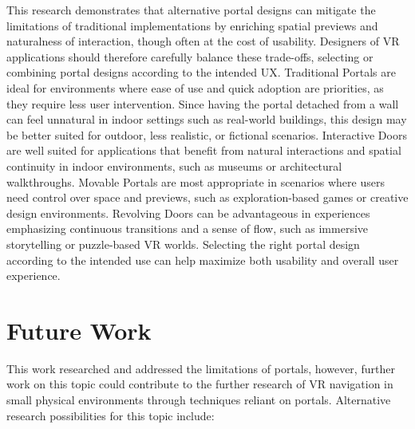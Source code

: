 This research demonstrates that alternative portal designs can mitigate the limitations of traditional implementations by 
enriching spatial previews and naturalness of interaction, though often at the cost of usability. Designers of VR applications should 
therefore carefully balance these trade-offs, selecting or combining portal designs according to the intended \gls{UX}. Traditional Portals 
are ideal for environments where ease of use and quick adoption are priorities, as they require less user intervention.
Since having the portal detached from a wall can feel unnatural in indoor settings such as real-world buildings, this design may be
better suited for outdoor, less realistic, or fictional scenarios. Interactive Doors are well suited for applications that benefit from
natural interactions and spatial continuity in indoor environments, such as museums or architectural walkthroughs. Movable Portals
are most appropriate in scenarios where users need control over space and previews, such as exploration-based games or creative
design environments. Revolving Doors can be advantageous in experiences emphasizing continuous transitions and a sense of flow,
such as immersive storytelling or puzzle-based VR worlds. Selecting the right portal design according to the intended use can help
maximize both usability and overall user experience. 


\section{Future Work}
\label{sec:future-work}

This work researched and addressed the limitations of portals, however, further work on this topic could contribute to the further research of 
\gls{VR} navigation in small physical environments through  techniques reliant on portals.
Alternative research possibilities for this topic include:

